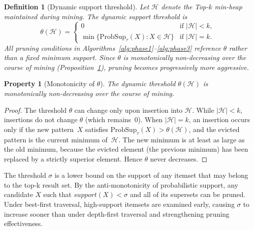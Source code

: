 \documentclass[10pt,letterpaper]{article}
\newtheorem{definition}{Definition}[section]
\newcounter{definition}
\newtheorem{property}{Property}
\begin{document}
\begin{definition}[Dynamic support threshold]
\label{def:dyn_threshold_formal}
Let $\mathcal{H}$ denote the Top-$k$ min-heap maintained during mining. The \emph{dynamic support threshold} is
\begin{equation}
\theta(\mathcal{H}) = \begin{cases} 
0 & \text{if } |\mathcal{H}| < k, \\
\min\{\mathrm{ProbSup}_{\tau}(X) : X \in \mathcal{H}\} & \text{if } |\mathcal{H}| = k.
\end{cases}
\label{eq:theta_def}
\end{equation}
All pruning conditions in Algorithms~\ref{alg:phase1}--\ref{alg:phase3} reference $\theta$ rather than a fixed minimum support. Since $\theta$ is monotonically non-decreasing over the course of mining (Proposition~\ref{prop:monotonicity}), pruning becomes progressively more aggressive.
\end{definition}


\begin{property}[Monotonicity of $\theta$]
\label{prop:monotonicity}
The dynamic threshold $\theta(\mathcal{H})$ is monotonically non-decreasing over the course of mining.
\end{property}

\begin{proof}
The threshold $\theta$ can change only upon insertion into $\mathcal{H}$. While $|\mathcal{H}| < k$, insertions do not change $\theta$ (which remains~$0$). When $|\mathcal{H}| = k$, an insertion occurs only if the new pattern~$X$ satisfies $\mathrm{ProbSup}_{\tau}(X) > \theta(\mathcal{H})$, and the evicted pattern is the current minimum of~$\mathcal{H}$. The new minimum is at least as large as the old minimum, because the evicted element (the previous minimum) has been replaced by a strictly superior element. Hence $\theta$ never decreases.
\end{proof}

The threshold $\sigma$ is a lower bound on the support of any itemset that may belong to the top-k result set. By the anti-monotonicity of probabilistic support, any candidate $X$ such that
$\mathit{support}(X) < \sigma $ and all of its supersets can be pruned. Under best-first traversal, high-support itemsets are examined early, causing $\sigma$ to increase sooner than under depth-first traversal and strengthening pruning effectiveness.
\end{document}
